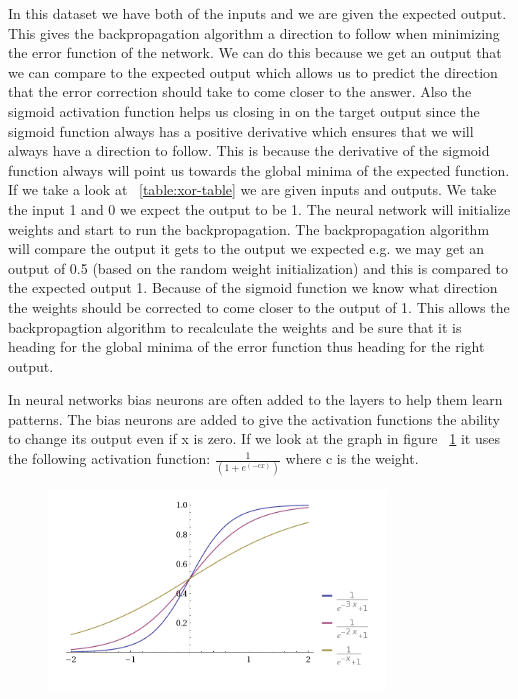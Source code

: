 In this dataset we have both of the inputs and we are given the expected output. This gives the backpropagation algorithm a direction to follow when minimizing the error function of the network. We can do this because we get an output that we can compare to the expected output which allows us to predict the direction that the error correction should take to come closer to the answer. Also the sigmoid activation function helps us closing in on the target output since the sigmoid function always has a positive derivative which ensures that we will always have a direction to follow\cite[p. 153]{rojas1996neural}. This is because the derivative of the sigmoid function always will point us towards the global minima of the expected function. If we take a look at ~\ref{table:xor-table} we are given inputs and outputs. We take the input 1 and 0 we expect the output to be 1. The neural network will initialize weights and start to run the backpropagation. The backpropagation algorithm will compare the output it gets to the output we expected e.g. we may get an output of 0.5 (based on the random weight initialization) and this is compared to the expected output 1. Because of the sigmoid function we know what direction the weights should be corrected to come closer to the output of 1. This allows the backpropagtion algorithm to recalculate the weights and be sure that it is heading for the global minima of the error function thus heading for the right output.

In neural networks bias neurons are often added to the layers to help them learn patterns. The bias neurons are added to give the activation functions the ability to change its output even if x is zero. If we look at the graph in figure ~\ref{fig:activationFunctions} it uses the following activation function: \begin{math} \frac{1}{(1+e^{(-cx)})} \end{math} where c is the weight.

\begin{figure}[h!]
\centering
\includegraphics[width=0.8\textwidth ,natwidth=410,natheight=237]{billeder/ActivationFunctions.png}
\caption{}
\label{fig:activationFunctions}
\end{figure}

